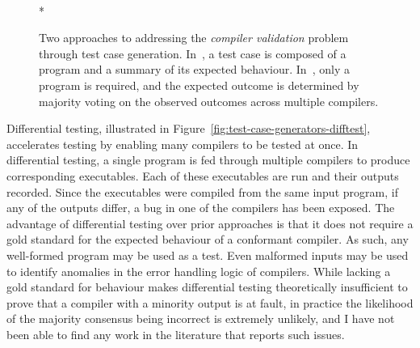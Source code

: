 \begin{figure}
  \centering
  \\*
  \caption[Generating and evaluating compiler test cases]{%
    Two approaches to addressing the \emph{compiler validation} problem through test case generation. In~\protect{}, a test case is composed of a program and a summary of its expected behaviour. In~\protect{}, only a program is required, and the expected outcome is determined by majority voting on the observed outcomes across multiple compilers.%
  }%
  \label{fig:test-case-generators}
\end{figure}

Differential testing, illustrated in Figure~\ref{fig:test-case-generators-difftest}, accelerates testing by enabling many compilers to be tested at once. In differential testing, a single program is fed through multiple compilers to produce corresponding executables. Each of these executables are run and their outputs recorded. Since the executables were compiled from the same input program, if any of the outputs differ, a bug in one of the compilers has been exposed. The advantage of differential testing over prior approaches is that it does not require a gold standard for the expected behaviour of a conformant compiler. As such, any well-formed program may be used as a test. Even malformed inputs may be used to identify anomalies in the error handling logic of compilers. While lacking a gold standard for behaviour makes differential testing theoretically insufficient to prove that a compiler with a minority output is at fault, in practice the likelihood of the majority consensus being incorrect is extremely unlikely, and I have not been able to find any work in the literature that reports such issues.

